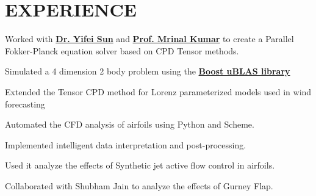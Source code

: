 \documentclass[]{resume}
\begin{document}
\hfill
\begin{minipage}[t]{0.66\textwidth}


\section{EXPERIENCE}
\vspace{\topsep} %
\begin{tightemize}
\item Worked with \textbf{\href{http://plaza.ufl.edu/yfsun/index.html}{Dr. Yifei Sun}} and
	\textbf{\href{http://web.mae.ufl.edu/~mrinalkumar/index.html}{Prof. Mrinal Kumar}} to create a Parallel
	Fokker-Planck equation solver based on CPD Tensor methods.
\item Simulated a 4 dimension 2 body problem using the
	\textbf{\href{http://www.boost.org/doc/libs/1_58_0/libs/numeric/ublas/doc}{Boost uBLAS library}}
\item Extended the Tensor CPD method for Lorenz parameterized models used in wind forecasting
\end{tightemize}
\sectionsep

\begin{tightemize}
\item Automated the CFD analysis of airfoils using Python and Scheme.
\item Implemented intelligent data interpretation and post-processing.
\item Used it analyze the effects of Synthetic jet active flow control in airfoils.
\item Collaborated with Shubham Jain to analyze the effects of Gurney Flap.
\end{tightemize}
\sectionsep



\end{minipage}
\end{document}
